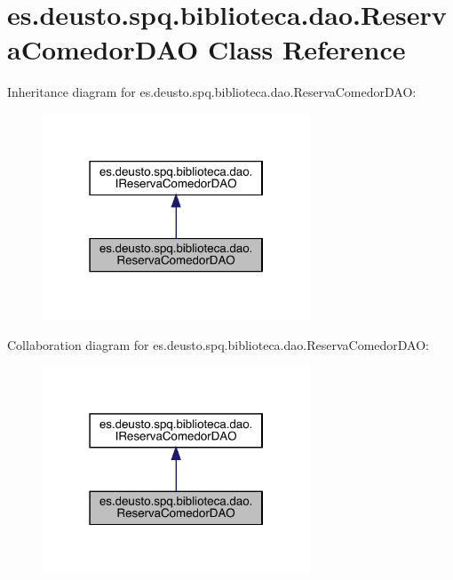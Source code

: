 \hypertarget{classes_1_1deusto_1_1spq_1_1biblioteca_1_1dao_1_1_reserva_comedor_d_a_o}{}\section{es.\+deusto.\+spq.\+biblioteca.\+dao.\+Reserva\+Comedor\+D\+AO Class Reference}
\label{classes_1_1deusto_1_1spq_1_1biblioteca_1_1dao_1_1_reserva_comedor_d_a_o}


Inheritance diagram for es.\+deusto.\+spq.\+biblioteca.\+dao.\+Reserva\+Comedor\+D\+AO\+:
\nopagebreak
\begin{figure}[H]
\begin{center}
\leavevmode
\includegraphics[width=226pt]{classes_1_1deusto_1_1spq_1_1biblioteca_1_1dao_1_1_reserva_comedor_d_a_o__inherit__graph}
\end{center}
\end{figure}


Collaboration diagram for es.\+deusto.\+spq.\+biblioteca.\+dao.\+Reserva\+Comedor\+D\+AO\+:
\nopagebreak
\begin{figure}[H]
\begin{center}
\leavevmode
\includegraphics[width=226pt]{classes_1_1deusto_1_1spq_1_1biblioteca_1_1dao_1_1_reserva_comedor_d_a_o__coll__graph}
\end{center}
\end{figure}
